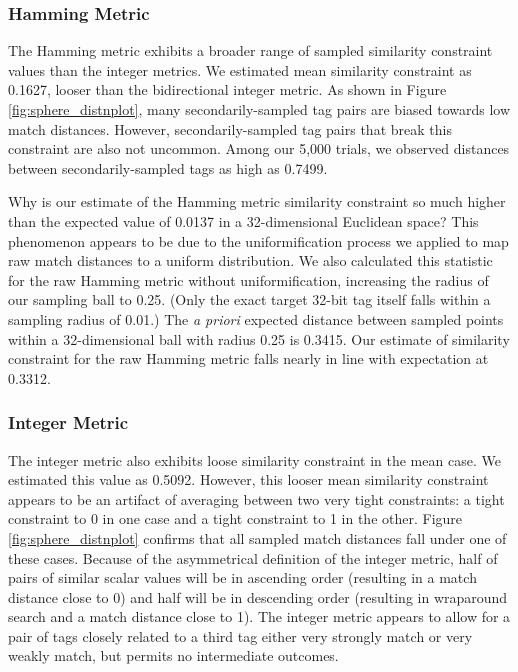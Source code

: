\subsubsection{Hamming Metric}

The Hamming metric exhibits a broader range of sampled similarity constraint values than the integer metrics.
We estimated mean similarity constraint as 0.1627, looser than the bidirectional integer metric.
As shown in Figure \ref{fig:sphere_distnplot}, many secondarily-sampled tag pairs are biased towards low match distances.
However, secondarily-sampled tag pairs that break this constraint are also not uncommon.
Among our 5,000 trials, we observed distances between secondarily-sampled tags as high as 0.7499.

Why is our estimate of the Hamming metric similarity constraint so much higher than the expected value of 0.0137 in a 32-dimensional Euclidean space?
This phenomenon appears to be due to the uniformification process we applied to map raw match distances to a uniform distribution.
We also calculated this statistic for the raw Hamming metric without uniformification, increasing the radius of our sampling ball to 0.25.
(Only the exact target 32-bit tag itself falls within a sampling radius of 0.01.)
The \textit{a priori} expected distance between sampled points within a 32-dimensional ball with radius 0.25 is 0.3415.
Our estimate of similarity constraint for the raw Hamming metric falls nearly in line with expectation at 0.3312.

\subsubsection{Integer Metric}

The integer metric also exhibits loose similarity constraint in the mean case.
We estimated this value as 0.5092.
However, this looser mean similarity constraint appears to be an artifact of averaging between two very tight constraints: a tight constraint to 0 in one case and a tight constraint to 1 in the other.
Figure \ref{fig:sphere_distnplot} confirms that all sampled match distances fall under one of these cases.
Because of the asymmetrical definition of the integer metric, half of pairs of similar scalar values will be in ascending order (resulting in a match distance close to 0) and half will be in descending order (resulting in wraparound search and a match distance close to 1).
The integer metric appears to allow for a pair of tags closely related to a third tag either very strongly match or very weakly match, but permits no intermediate outcomes.

